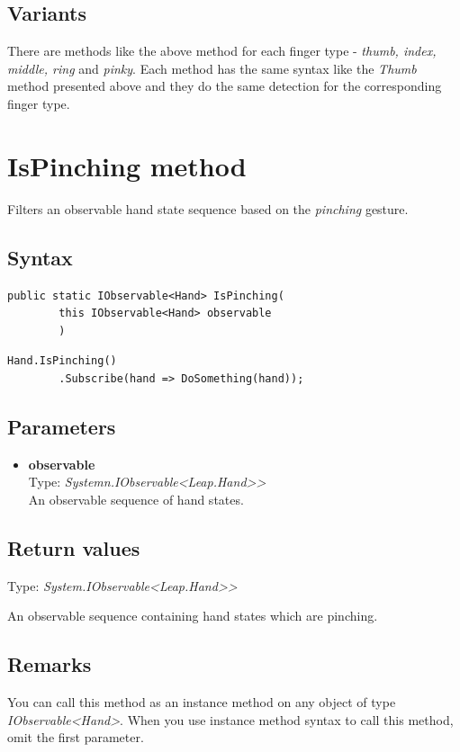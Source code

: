 \documentclass[12pt,a4paper,twoside]{report}
\begin{document}
\subsection{Variants}
There are methods like the above method for each finger type - \textit{thumb, index, middle, ring} and \textit{pinky}. Each method has the same syntax like the \textit{Thumb} method presented above and they do the same detection for the corresponding finger type.

\section{IsPinching method}
Filters an observable hand state sequence based on the \textit{pinching} gesture.

\subsection{Syntax}
\begin{lstlisting}[caption=Declaration]
    public static IObservable<Hand> IsPinching(
        this IObservable<Hand> observable
        )
\end{lstlisting}

\begin{lstlisting}[caption=Usage example]
    Hand.IsPinching()
        .Subscribe(hand => DoSomething(hand));
\end{lstlisting}

\subsection{Parameters}
\begin{itemize}
    \item \textbf{observable}\\
        Type: \textit{Systemn.IObservable<Leap.Hand>{}>}\\
        An observable sequence of hand states.
\end{itemize}

\subsection{Return values}
Type: \textit{System.IObservable<Leap.Hand>{}>}

An observable sequence containing hand states which are pinching.

\subsection{Remarks}
You can call this method as an instance method on any object of type \textit{IObservable<Hand>}. When you use 
instance method syntax to call this method, omit the first parameter.
\end{document}
